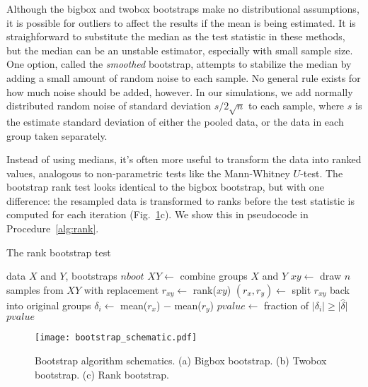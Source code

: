 \documentclass[10pt]{article} %
\begin{document}
Although the bigbox and twobox bootstraps make no distributional assumptions, it is possible for outliers to affect the results if the mean is being estimated. It is straighforward to substitute the median as the test statistic in these methods, but the median can be an unstable estimator, especially with small sample size. One option, called the \emph{smoothed} bootstrap, attempts to stabilize the median by adding a small amount of random noise to each sample. No general rule exists for how much noise should be added, however. In our simulations, we add normally distributed random noise of standard deviation $s/2\sqrt{n}$ to each sample, where $s$ is the estimate standard deviation of either the pooled data, or the data in each group taken separately. 

Instead of using medians, it's often more useful to transform the data into ranked values, analogous to non-parametric tests like the Mann-Whitney $U$-test. The bootstrap rank test looks identical to the bigbox bootstrap, but with one difference: the resampled data is transformed to ranks before the test statistic is computed for each iteration (Fig.~\ref{fig:schematic}c). We show this in pseudocode in Procedure~\ref{alg:rank}.

\begin{algorithm}
\caption{The rank bootstrap test}
\label{alg:rank}
\begin{algorithmic} 
\REQUIRE data $X$ and $Y$, bootstraps $nboot$
\STATE $XY \leftarrow$ combine groups $X$ and $Y$
 \STATE $xy \leftarrow$ draw $n$ samples from $XY$ with replacement
 \STATE $r_{xy} \leftarrow$ rank($xy$)
 \STATE $(r_{x}, r_{y}) \leftarrow$ split $r_{xy}$ back into original groups
 \STATE $\delta_i \leftarrow$ mean($r_{x}$) $-$ mean($r_{y}$)
 \ENDFOR
 \STATE $pvalue \leftarrow$ fraction of $\lvert \delta_i \rvert \geq \lvert \hat{\delta} \rvert $
\ENSURE $pvalue$
\end{algorithmic}
\end{algorithm}




\begin{figure}
  \texttt{[image: bootstrap\_schematic.pdf]}
  \caption{Bootstrap algorithm schematics. (a) Bigbox bootstrap. (b) Twobox bootstrap. (c) Rank bootstrap.}
  \label{fig:schematic}
\end{figure}
\end{document}
